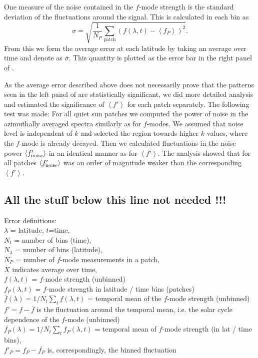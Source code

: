\documentclass{aa}
\begin{document}
One measure of the noise contained in the $f$-mode strength is the standard deviation of the fluctuations
around the signal. This is calculated in each bin as
\begin{equation}
\sigma= \sqrt{\frac{1}{N_P}\sum_{\mbox{patch}} ( f(\lambda,t)
- \left<f_P\right>)^2}.
\end{equation}
From this we form the average error at each latitude by taking an average over time and denote as $\overline{\sigma}$. 
This quantity is plotted as the error bar in the right panel of .

As the average error described above does not necessarily prove that the patterns seen in the left panel of  are statistically significant, we did more detailed analysis and estimated the significance of $\left< f' \right>$ for each patch separately. The following test was made: For all quiet sun patches we computed the power of noise in the azimuthally averaged spectra similarly as for $f$-modes. We assumed that noise level is independent of $k$ and selected the region towards higher $k$ values, where the $f$-mode is already decayed. Then we calculated fluctuations in the noise power $\left< f'_{\rm noise} \right>$ in an identical manner as for $\left< f' \right>$.
The analysis showed that for all patches $\left< f'_{\rm noise} \right>$ was an order of magnitude weaker than the corresponding $\left< f' \right>$.

\color{cyan}
\subsection*{All the stuff below this line not needed !!!}
Error definitions:\\
$\lambda$ = latitude, $t$=time, \\
$N_t$ = number of bins (time), \\
$N_\lambda$ = number of bins (latitude), \\
$N_P$ = number of $f$-mode measurements in a patch, \\
$\overline{X}$ indicates average over time, \\
$f(\lambda,t)$ = $f$-mode strength (unbinned)\\
$f_P(\lambda,t)$ = $f$-mode strength in latitude / time bins (patches)\\
$\overline{f}(\lambda) = 1/N_t \sum_t f(\lambda,t)$ = temporal mean of the $f$-mode strength (unbinned)\\ 
$f'=f-\overline{f}$ is the fluctuation around the temporal mean, i.e. the solar cycle dependence of the $f$-mode (unbinned)\\
$\overline{f_P}(\lambda) = 1/N_t \sum_t f_P(\lambda,t)$ = temporal mean of 
$f$-mode strength (in lat / time bins), \\
$f'_P=f_P-\overline{f_P}$ is, correspondingly, the binned fluctuation\\
\end{document}
